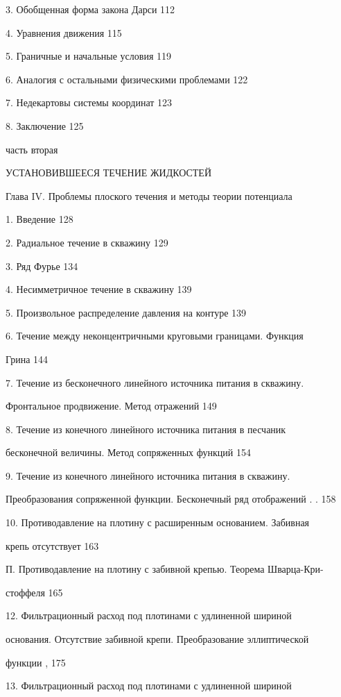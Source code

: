 \documentclass[
  11pt,
]{article}
\begin{document}
3. Обобщенная форма закона Дарси 112 \par
4. Уравнения движения 115 \par
5. Граничные и начальные условия 119 \par
6. Аналогия с остальными физическими проблемами 122 \par
7. Недекартовы системы координат 123 \par
8. Заключение 125 \par
часть вторая \par
УСТАНОВИВШЕЕСЯ ТЕЧЕНИЕ ЖИДКОСТЕЙ \par
Глава IV. Проблемы плоского течения и методы теории потенциала \par
1. Введение 128 \par
2. Радиальное течение в скважину 129 \par
3. Ряд Фурье 134 \par
4. Несимметричное течение в скважину 139 \par
5. Произвольное распределение давления на контуре 139 \par
6. Течение между неконцентричными круговыми границами. Функция \par
Грина 144 \par
7. Течение из бесконечного линейного источника питания в скважину. \par
Фронтальное продвижение. Метод отражений 149 \par
8. Течение из конечного линейного источника питания в песчаник  \par
бесконечной величины. Метод сопряженных функций 154 \par
9. Течение из конечного линейного источника питания в скважину.  \par
Преобразования сопряженной функции. Бесконечный ряд отображений . . 158 \par
10. Противодавление на плотину с расширенным основанием. Забивная \par
крепь отсутствует 163 \par
П. Противодавление на плотину с забивной крепью. Теорема Шварца-Кри- \par
стоффеля 165 \par
12. Фильтрационный расход под плотинами с удлиненной шириной  \par
основания. Отсутствие забивной крепи. Преобразование эллиптической  \par
функции , 175 \par
13. Фильтрационный расход под плотинами с удлиненной шириной  \par
\end{document}
